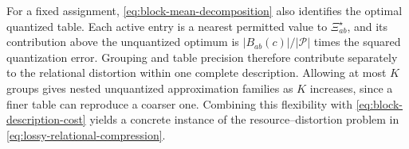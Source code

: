 For a fixed assignment, \cref{eq:block-mean-decomposition} also identifies the optimal quantized table.
Each active entry is a nearest permitted value to $\Xi_{ab}^\star$, and its contribution above the unquantized optimum is $|B_{ab}(c)|/|\mathcal P|$ times the squared quantization error.
Grouping and table precision therefore contribute separately to the relational distortion within one complete description.
Allowing at most $K$ groups gives nested unquantized approximation families as $K$ increases, since a finer table can reproduce a coarser one.
Combining this flexibility with \cref{eq:block-description-cost} yields a concrete instance of the resource--distortion problem in \cref{eq:lossy-relational-compression}.
